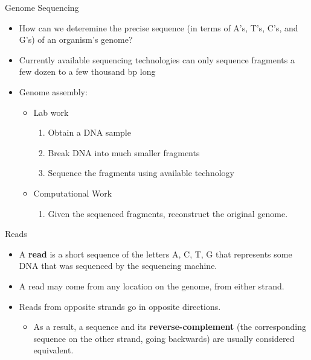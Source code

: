 \documentclass[xcolor=dvipsnames]{beamer}
\begin{document}
\begin{frame}{Genome Sequencing}
	\begin{itemize}
		\item How can we deteremine the precise sequence (in terms of A's, T's,
		C's, and G's) of an organism's genome?

		\item Currently available sequencing technologies can only sequence
		fragments a few dozen to a few thousand bp long

		\item Genome assembly:
			\begin{itemize}
				\item Lab work
				\begin{enumerate}[1.]
						\item Obtain a DNA sample
						\item Break DNA into much smaller fragments
						\item Sequence the fragments using available technology
				\end{enumerate}
				\item Computational Work
				\begin{enumerate}[4.]
					\item Given the sequenced fragments, reconstruct the original genome.
				\end{enumerate}
			\end{itemize}
	\end{itemize}
\end{frame}

\begin{frame}{Reads}
	\begin{itemize}
		\item A {\bf read} is a short sequence of the letters A, C, T, G that
		represents some DNA that was sequenced by the sequencing machine.
		\item A read may come from any location on the genome, from either
		strand.
		\item Reads from opposite strands go in opposite directions.
			\begin{itemize}
				\item As a result, a sequence and its {\bf reverse-complement}
				(the corresponding sequence on the other strand, going
				backwards) are usually considered equivalent.
			\end{itemize}
	\end{itemize}
\end{frame}
\end{document}
